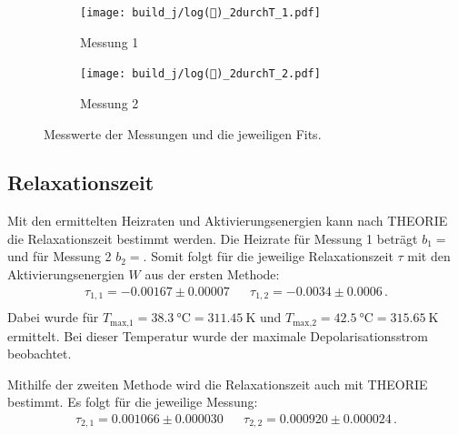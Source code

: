   \begin{figure}
    \begin{subfigure}[b]{.5\linewidth}
      \centering
      \texttt{[image: build\_j/log()\_2durchT\_1.pdf]}
      \caption{Messung 1}
    \end{subfigure}

    \begin{subfigure}[b]{.5\linewidth}
      \centering
      \texttt{[image: build\_j/log()\_2durchT\_2.pdf]}
      \caption{Messung 2}
    \end{subfigure}

    \caption{Messwerte der Messungen und die jeweiligen Fits.}
    \label{fig:Trapez}
  \end{figure} %

\subsection{Relaxationszeit}
  Mit den ermittelten Heizraten und Aktivierungsenergien kann nach THEORIE die Relaxationszeit bestimmt werden.
  Die Heizrate für Messung 1 beträgt $b_1 = $ und für Messung 2 $b_2 = $.
  Somit folgt für die jeweilige Relaxationszeit $\tau$ mit den Aktivierungsenergien $W$ aus der ersten Methode:
  \begin{align*}
    \tau_{1,1} = -0.00167 \pm 0.00007 &&  \tau_{1,2} = -0.0034 \pm 0.0006 \, . \\
  \end{align*}
  Dabei wurde für $T_\text{max,1} = \SI{38.3}{\celsius} = \SI{311.45}{\kelvin} $ und $T_\text{max,2} = \SI{42.5}{\celsius} = \SI{315.65}{\kelvin}$ ermittelt.
  Bei dieser Temperatur wurde der maximale Depolarisationsstrom beobachtet.

  \noindent
  Mithilfe der zweiten Methode wird die Relaxationszeit auch mit THEORIE bestimmt.
  Es folgt für die jeweilige Messung:
  \begin{align*}
    \tau_{2,1} =  0.001066 \pm 0.000030 &&  \tau_{2,2} = 0.000920 \pm 0.000024\, . \\
  \end{align*}
